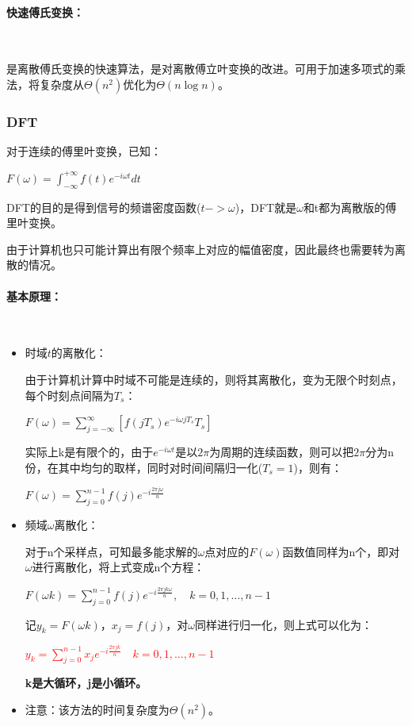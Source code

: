 \documentclass[UTF8]{article}%
\begin{document}
\paragraph{快速傅氏变换：}~{}

是离散傅氏变换的快速算法，是对离散傅立叶变换的改进。可用于加速多项式的乘法，将复杂度从$\varTheta(n^2)$优化为$\varTheta(n \log n)$。

\subsubsection{DFT}

对于连续的傅里叶变换，已知：

$F(\omega)=\int_{-\infty}^{+\infty} f(t) e^{- i \omega t} d t$

DFT的目的是得到信号的频谱密度函数($t->\omega$)，DFT就是$\omega$和t都为离散版的傅里叶变换。

由于计算机也只可能计算出有限个频率上对应的幅值密度，因此最终也需要转为离散的情况。

\paragraph{基本原理：}~{}

\begin{itemize}
    \item 时域$t$的离散化：
    
    由于计算机计算中时域不可能是连续的，则将其离散化，变为无限个时刻点，每个时刻点间隔为$T_s$：

    $F(\omega )=\sum_{j=-\infty}^{\infty}[f(jT_s)e^{-i\omega jT_s}T_s]$
    
    实际上k是有限个的，由于$e^{-i\omega t}$是以$2\pi$为周期的连续函数，则可以把$2\pi$分为n份，在其中均匀的取样，同时对时间间隔归一化($T_s=1$)，则有：

    $F(\omega )=\sum_{j=0}^{n-1}f(j)e^{-i \frac{2 \pi j \omega }{n}}$

    \item 频域$\omega$离散化：
    
    对于n个采样点，可知最多能求解的$\omega$点对应的$F(\omega)$函数值同样为n个，即对$\omega$进行离散化，将上式变成n个方程：
    
    $F(\omega k )=\sum_{j=0}^{n-1}f(j)e^{-i \frac{2 \pi j k \omega }{n}},\quad k=0,1,\dots,n-1$

    
    记$y_k=F(\omega k)$，$x_j=f(j)$，对$\omega$同样进行归一化，则上式可以化为：

    \textcolor{red}{$y_k=\sum_{j=0}^{n-1} x_j e^{- i \frac{2 \pi j k }{n}}\quad k=0,1,...,n-1$}

    \textbf{k是大循环，j是小循环。}

    \item 注意：该方法的时间复杂度为$\varTheta(n^2)$。
\end{itemize}
\end{document}
